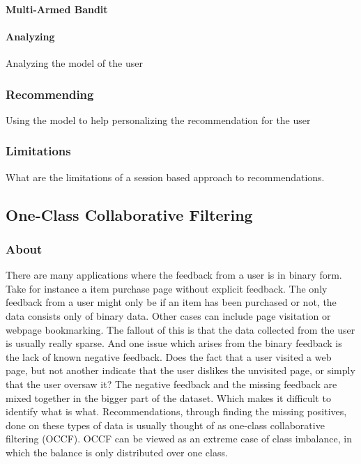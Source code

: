 

\paragraph{Multi-Armed Bandit} %
\label{par:multi_armed_bandit}

\paragraph{Analyzing}
    Analyzing the model of the user

\subsubsection{Recommending}
    Using the model to help personalizing the recommendation for the user

\subsubsection{Limitations}
    What are the limitations of a session based approach to recommendations.



\subsection{One-Class Collaborative Filtering}

\subsubsection{About}
There are many applications where the feedback from a user is in binary form.
Take for instance a item purchase page without explicit feedback.  The only
feedback from a user might only be if an item has been purchased or not, the
data consists only of binary data.  Other cases can include page visitation or
webpage bookmarking.  The fallout of this is that the data collected from the
user is usually really sparse.  And one issue which arises from the binary
feedback is the lack of known negative feedback.  Does the fact that a user
visited a web page, but not another indicate that the user dislikes the
unvisited page, or simply that the user oversaw it?  The negative feedback and
the missing feedback are mixed together in the bigger part of the dataset.
Which makes it difficult to identify what is what.  Recommendations, through
finding the missing positives, done on these types of data is usually thought
of as one-class collaborative filtering (OCCF).  OCCF can be viewed as an
extreme case of class imbalance, in which the balance is only distributed over
one class. 


